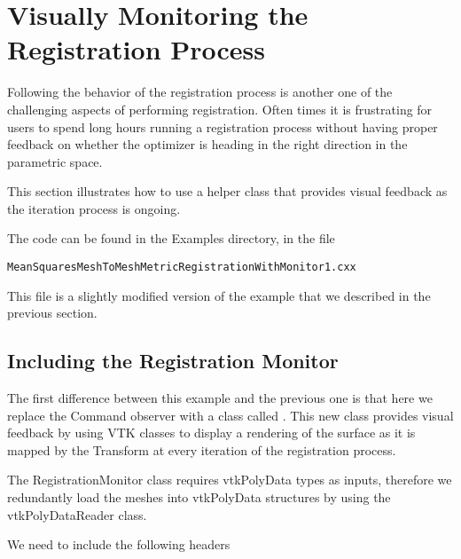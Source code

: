 \documentclass{InsightArticle}
\begin{document}
\begin{center}

\end{center}


\section{Visually Monitoring the Registration Process}

Following the behavior of the registration process is another one of the
challenging aspects of performing registration. Often times it is frustrating
for users to spend long hours running a registration process without having
proper feedback on whether the optimizer is heading in the right direction in
the parametric space.

This section illustrates how to use a helper class that provides visual
feedback as the iteration process is ongoing.

The code can be found in the Examples directory, in the file

\begin{verbatim} 
MeanSquaresMeshToMeshMetricRegistrationWithMonitor1.cxx
\end{verbatim} 

This file is a slightly modified version of the example that we described in
the previous section.


\subsection{Including the Registration Monitor}

The first difference between this example and the previous one is that here we
replace the Command observer with a class called .
This new class provides visual feedback by using VTK classes to display a
rendering of the surface as it is mapped by the Transform at every iteration of
the registration process.

The RegistrationMonitor class requires vtkPolyData types as inputs, therefore
we redundantly load the meshes into vtkPolyData structures by using the
vtkPolyDataReader class.

We need to include the following headers

\begin{center}

\end{center}
\end{document}
